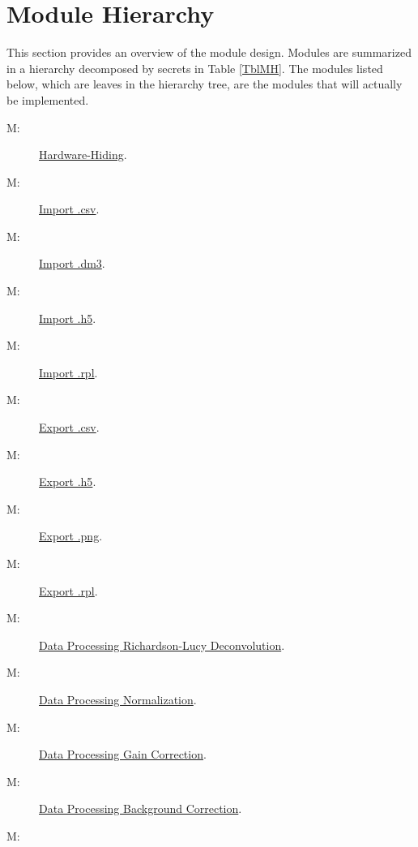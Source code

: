 \documentclass[12pt, titlepage]{article}
\newcounter{mnum}
\newcommand{\mthemnum}{M\themnum}
\begin{document}
\section{Module Hierarchy} \label{SecMH}

This section provides an overview of the module design. Modules are summarized
in a hierarchy decomposed by secrets in Table \ref{TblMH}. The modules listed
below, which are leaves in the hierarchy tree, are the modules that will
actually be implemented.

\begin{description}
	\item [ \mthemnum \label{mHH}:]
    \hyperref[sssec:HH]{Hardware-Hiding}.
	\item [ \mthemnum \label{mcsvIm}:]
    \hyperref[sssec:ImportCSV]{Import .csv}.
	\item [ \mthemnum \label{mdm3Im}:]
    \hyperref[sssec:ImportDM3]{Import .dm3}.
	\item [ \mthemnum \label{mh5Im}:]
    \hyperref[sssec:ImportH5]{Import .h5}.
	\item [ \mthemnum \label{mrplIm}:]
    \hyperref[sssec:ImportRPL]{Import .rpl}.
	\item [ \mthemnum \label{mcsvEx}:]
    \hyperref[sssec:ExportCSV]{Export .csv}.
	\item [ \mthemnum \label{mh5Ex}:]
    \hyperref[sssec:ExportH5]{Export .h5}.
	\item [ \mthemnum \label{mpngEx}:]
    \hyperref[sssec:ExportPNG]{Export .png}.
	\item [ \mthemnum \label{mrplEx}:]
    \hyperref[sssec:ExportRPL]{Export .rpl}.
	\item [ \mthemnum \label{mRL}:] \hyperref[sssec:RL]{Data
        Processing Richardson-Lucy Deconvolution}.
	\item [ \mthemnum \label{mNorm}:]
    \hyperref[sssec:Norm]{Data Processing Normalization}.
	\item [ \mthemnum \label{mGain}:]
    \hyperref[sssec:Gain]{Data Processing Gain Correction}.
	\item [ \mthemnum \label{mBkgnd}:]
    \hyperref[sssec:Bkgnd]{Data Processing Background Correction}.
	\item [ \mthemnum \label{m1Dslice}:]

\end{description}
\end{document}
